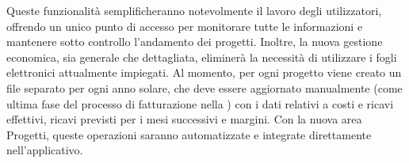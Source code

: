 Queste funzionalità semplificheranno notevolmente il lavoro degli utilizzatori, offrendo un unico punto di accesso per monitorare tutte le informazioni e mantenere
sotto controllo l’andamento dei progetti. Inoltre, la nuova gestione economica, sia generale che dettagliata, eliminerà la necessità di utilizzare i fogli elettronici
attualmente impiegati. Al momento, per ogni progetto viene creato un file separato per ogni anno solare, che deve essere aggiornato manualmente (come ultima fase del
processo di fatturazione nella ) con i dati relativi a costi e ricavi effettivi, ricavi previsti per i mesi successivi e margini. Con la nuova area
Progetti, queste operazioni saranno automatizzate e integrate direttamente nell’applicativo.
